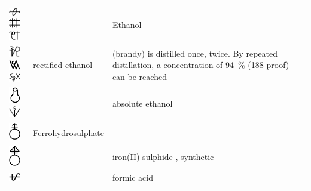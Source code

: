 \documentclass[british,final,landscape]{scrartcl}
\begin{document}
\begin{refsection}
\begin{supertabular}{p{0.3\textwidth}p{0.34\textwidth}p{0.34\textwidth}}
\includegraphics[width=5mm]{Compounds/Ethanol19} \includegraphics[width=5mm]{Compounds/Ethanol20} \includegraphics[width=5mm]{Compounds/Ethanol21} &  & Ethanol \\
   \includegraphics[width=5mm]{Compounds/RectifiedEthanol} \includegraphics[width=5mm]{Compounds/RectifiedEthanol2} \includegraphics[width=5mm]{Compounds/RectifiedEthanol3} & rectified ethanol &  (brandy) is distilled once,  twice. By repeated distillation, a concentration of \SI{94}{\%} (188 proof) can be reached \\
   \includegraphics[width=5mm]{Compounds/VinumSublimatum} \includegraphics[width=5mm]{Compounds/VinumSublimatum2} &  & absolute ethanol \\
   \includegraphics[width=5mm]{Compounds/Ferrohydrosulphate} & Ferrohydrosulphate & \\
   \includegraphics[width=5mm]{Compounds/FerrumSulphuratum} &  & iron(II) sulphide , synthetic \\
   \includegraphics[width=5mm]{Compounds/AcidumFormicarum} &  & formic acid  \\

\end{supertabular}
\end{refsection}
\end{document}
